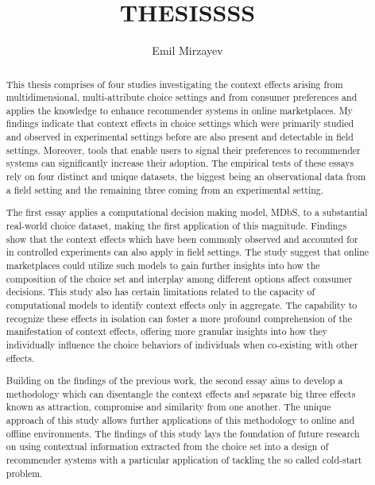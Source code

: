 \documentclass[a4paper,12pt]{article}
\title{{\bf \Large THESISSSS}
}
\author{Emil Mirzayev}
\begin{document}
\maketitle

\begin{abstract}

    This thesis comprises of four studies investigating the context effects arising from multidimensional, multi-attribute choice settings and from consumer preferences and applies the knowledge to enhance recommender systems in online marketplaces. My findings indicate that context effects in choice settings which were primarily studied and observed in experimental settings before are also present and detectable in field settings. Moreover, tools that enable users to signal their preferences to recommender systems can significantly increase their adoption. The empirical tests of these essays rely on four distinct and unique datasets, the biggest being an observational data from a field setting and the remaining three coming from an experimental setting.

    The first essay applies a computational decision making model, MDbS, to a substantial real-world choice dataset, making the first application of this magnitude. Findings show that the context effects which have been commonly observed and accounted for in controlled experiments can also apply in field settings. The study suggest that online marketplaces could utilize such models to gain further insights into how the composition of the choice set and interplay among different options affect consumer decisions. This study also has certain limitations related to the capacity of computational models to identify context effects only in aggregate. The capability to recognize these effects in isolation can foster a more profound comprehension of the manifestation of context effects, offering more granular insights into how they individually influence the choice behaviors of individuals when co-existing with other effects.

    Building on the findings of the previous work, the second essay aims to develop a methodology which can disentangle the context effects and separate big three effects known as attraction, compromise and similarity from one another. The unique approach of this study allows further applications of this methodology to online and offline environments. The findings of this study lays the foundation of future research on using contextual information extracted from the choice set into a design of recommender systems with a particular application of tackling the so called cold-start problem.


\end{abstract}
\end{document}
